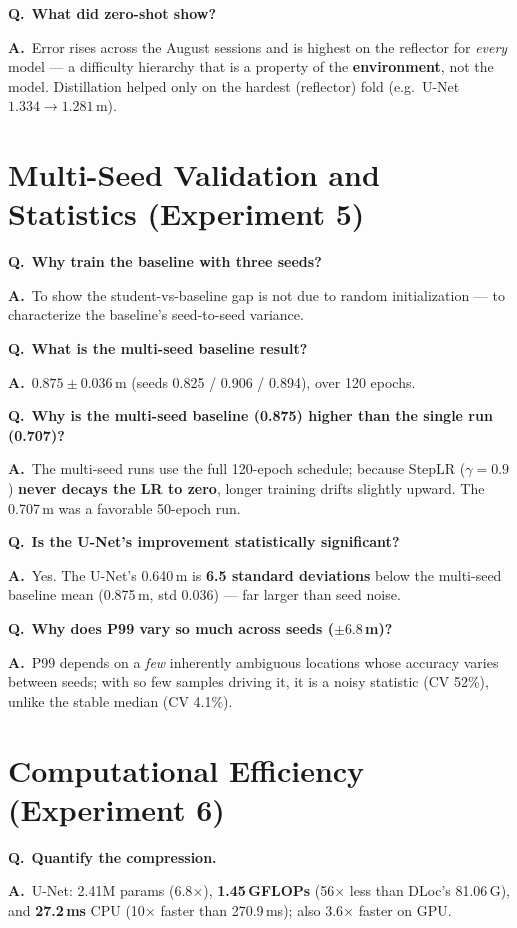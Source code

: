 \documentclass[11pt]{article}
\newcommand{\Q}[1]{\medskip\noindent\textbf{\textcolor{blue!50!black}{Q.}}\ \textbf{#1}\par\nopagebreak}
\newcommand{\A}{\noindent\textbf{A.}\ }
\begin{document}
\Q{What did zero-shot show?}
\A Error rises across the August sessions and is highest on the reflector for \emph{every} model --- a
difficulty hierarchy that is a property of the \textbf{environment}, not the model. Distillation helped
only on the hardest (reflector) fold (e.g.\ U-Net $1.334 \to 1.281$\,m).

\section{Multi-Seed Validation and Statistics (Experiment 5)}

\Q{Why train the baseline with three seeds?}
\A To show the student-vs-baseline gap is not due to random initialization --- to characterize the
baseline's seed-to-seed variance.

\Q{What is the multi-seed baseline result?}
\A $0.875 \pm 0.036$\,m (seeds 0.825 / 0.906 / 0.894), over 120 epochs.

\Q{Why is the multi-seed baseline (0.875) higher than the single run (0.707)?}
\A The multi-seed runs use the full 120-epoch schedule; because StepLR ($\gamma{=}0.9$) \textbf{never
decays the LR to zero}, longer training drifts slightly upward. The 0.707\,m was a favorable 50-epoch run.

\Q{Is the U-Net's improvement statistically significant?}
\A Yes. The U-Net's 0.640\,m is \textbf{6.5 standard deviations} below the multi-seed baseline mean
(0.875\,m, std 0.036) --- far larger than seed noise.

\Q{Why does P99 vary so much across seeds ($\pm6.8$\,m)?}
\A P99 depends on a \emph{few} inherently ambiguous locations whose accuracy varies between seeds; with
so few samples driving it, it is a noisy statistic (CV 52\%), unlike the stable median (CV 4.1\%).

\section{Computational Efficiency (Experiment 6)}

\Q{Quantify the compression.}
\A U-Net: 2.41M params (6.8$\times$), \textbf{1.45\,GFLOPs} (56$\times$ less than DLoc's 81.06\,G), and
\textbf{27.2\,ms} CPU (10$\times$ faster than 270.9\,ms); also 3.6$\times$ faster on GPU.
\end{document}
